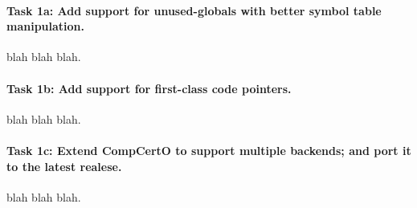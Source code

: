 


\paragraph*{Task 1a: Add support for unused-globals with better symbol table manipulation.}
blah blah blah.

\paragraph*{Task 1b: Add support for first-class code pointers.}
blah blah blah.

\paragraph*{Task 1c: Extend CompCertO to support multiple backends; and port it to the latest realese.}
blah blah blah.
